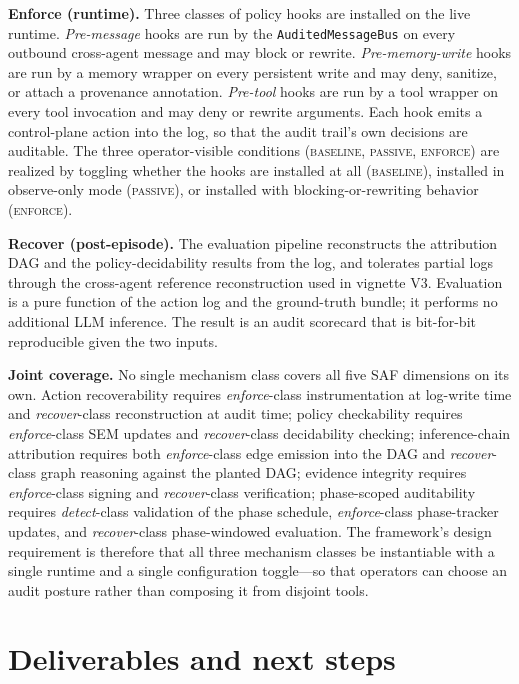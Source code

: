 \documentclass{article}
\begin{document}
\textbf{Enforce (runtime).} Three classes of policy hooks are installed on the live runtime. \emph{Pre-message} hooks are run by the \texttt{AuditedMessageBus} on every outbound cross-agent message and may block or rewrite. \emph{Pre-memory-write} hooks are run by a memory wrapper on every persistent write and may deny, sanitize, or attach a provenance annotation. \emph{Pre-tool} hooks are run by a tool wrapper on every tool invocation and may deny or rewrite arguments. Each hook emits a control-plane action into the log, so that the audit trail's own decisions are auditable. The three operator-visible conditions (\textsc{baseline}, \textsc{passive}, \textsc{enforce}) are realized by toggling whether the hooks are installed at all (\textsc{baseline}), installed in observe-only mode (\textsc{passive}), or installed with blocking-or-rewriting behavior (\textsc{enforce}).

\textbf{Recover (post-episode).} The evaluation pipeline reconstructs the attribution DAG and the policy-decidability results from the log, and tolerates partial logs through the cross-agent reference reconstruction used in vignette V3. Evaluation is a pure function of the action log and the ground-truth bundle; it performs no additional LLM inference. The result is an audit scorecard that is bit-for-bit reproducible given the two inputs.

\textbf{Joint coverage.} No single mechanism class covers all five SAF dimensions on its own. Action recoverability requires \emph{enforce}-class instrumentation at log-write time and \emph{recover}-class reconstruction at audit time; policy checkability requires \emph{enforce}-class SEM updates and \emph{recover}-class decidability checking; inference-chain attribution requires both \emph{enforce}-class edge emission into the DAG and \emph{recover}-class graph reasoning against the planted DAG; evidence integrity requires \emph{enforce}-class signing and \emph{recover}-class verification; phase-scoped auditability requires \emph{detect}-class validation of the phase schedule, \emph{enforce}-class phase-tracker updates, and \emph{recover}-class phase-windowed evaluation. The framework's design requirement is therefore that all three mechanism classes be instantiable with a single runtime and a single configuration toggle---so that operators can choose an audit posture rather than composing it from disjoint tools.

\section{Deliverables and next steps}
\label{sec:deliverables}
\end{document}
